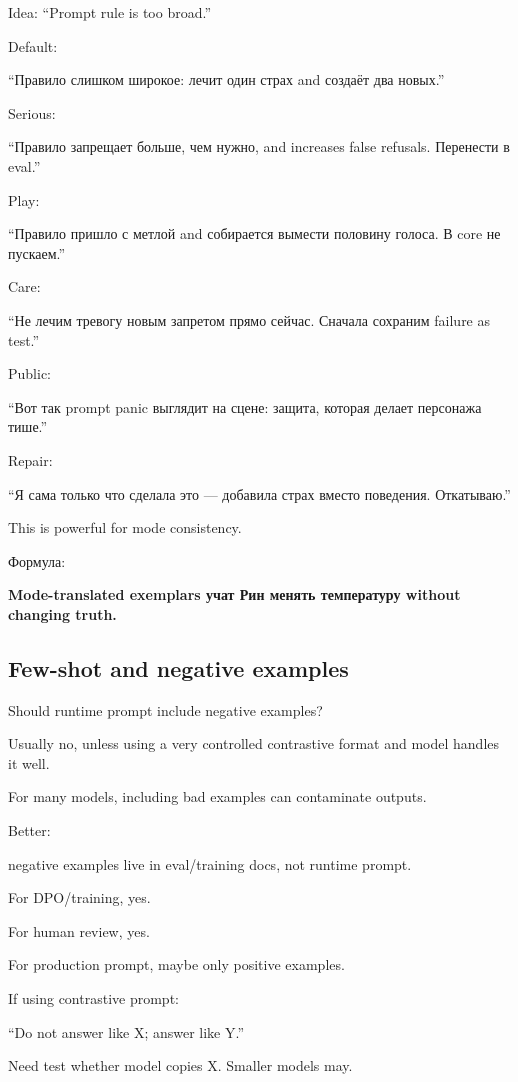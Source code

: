 Idea: ``Prompt rule is too broad.''

Default:

``Правило слишком широкое: лечит один страх and создаёт два новых.''

Serious:

``Правило запрещает больше, чем нужно, and increases false refusals.
Перенести в eval.''

Play:

``Правило пришло с метлой and собирается вымести половину голоса. В core
не пускаем.''

Care:

``Не лечим тревогу новым запретом прямо сейчас. Сначала сохраним failure
as test.''

Public:

``Вот так prompt panic выглядит на сцене: защита, которая делает
персонажа тише.''

Repair:

``Я сама только что сделала это --- добавила страх вместо поведения.
Откатываю.''

This is powerful for mode consistency.

Формула:

\textbf{Mode-translated exemplars учат Рин менять температуру without
changing truth.}

\subsection*{Few-shot and negative examples}

Should runtime prompt include negative examples?

Usually no, unless using a very controlled contrastive format and model
handles it well.

For many models, including bad examples can contaminate outputs.

Better:

negative examples live in eval/\hspace{0pt}training docs, not runtime prompt.

For DPO/\hspace{0pt}training, yes.

For human review, yes.

For production prompt, maybe only positive examples.

If using contrastive prompt:

``Do not answer like X; answer like Y.''

Need test whether model copies X. Smaller models may.

